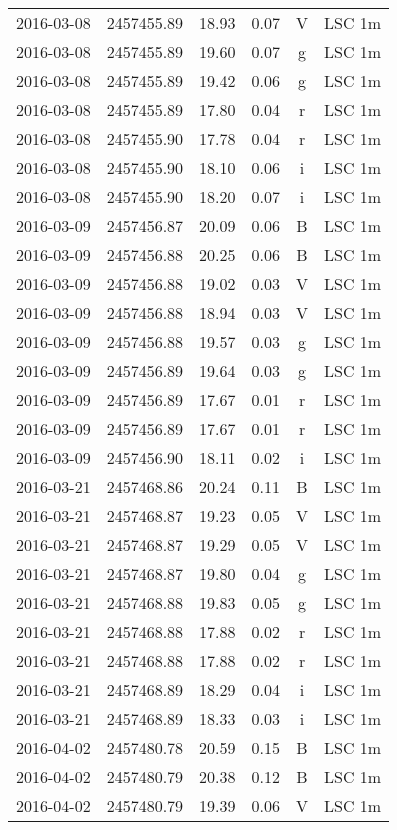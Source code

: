 \begin{table}
\begin{tabular}{cccccc}
2016-03-08 & 2457455.89 & 18.93 & 0.07 & V & LSC 1m \\
2016-03-08 & 2457455.89 & 19.60 & 0.07 & g & LSC 1m \\
2016-03-08 & 2457455.89 & 19.42 & 0.06 & g & LSC 1m \\
2016-03-08 & 2457455.89 & 17.80 & 0.04 & r & LSC 1m \\
2016-03-08 & 2457455.90 & 17.78 & 0.04 & r & LSC 1m \\
2016-03-08 & 2457455.90 & 18.10 & 0.06 & i & LSC 1m \\
2016-03-08 & 2457455.90 & 18.20 & 0.07 & i & LSC 1m \\
2016-03-09 & 2457456.87 & 20.09 & 0.06 & B & LSC 1m \\
2016-03-09 & 2457456.88 & 20.25 & 0.06 & B & LSC 1m \\
2016-03-09 & 2457456.88 & 19.02 & 0.03 & V & LSC 1m \\
2016-03-09 & 2457456.88 & 18.94 & 0.03 & V & LSC 1m \\
2016-03-09 & 2457456.88 & 19.57 & 0.03 & g & LSC 1m \\
2016-03-09 & 2457456.89 & 19.64 & 0.03 & g & LSC 1m \\
2016-03-09 & 2457456.89 & 17.67 & 0.01 & r & LSC 1m \\
2016-03-09 & 2457456.89 & 17.67 & 0.01 & r & LSC 1m \\
2016-03-09 & 2457456.90 & 18.11 & 0.02 & i & LSC 1m \\
2016-03-21 & 2457468.86 & 20.24 & 0.11 & B & LSC 1m \\
2016-03-21 & 2457468.87 & 19.23 & 0.05 & V & LSC 1m \\
2016-03-21 & 2457468.87 & 19.29 & 0.05 & V & LSC 1m \\
2016-03-21 & 2457468.87 & 19.80 & 0.04 & g & LSC 1m \\
2016-03-21 & 2457468.88 & 19.83 & 0.05 & g & LSC 1m \\
2016-03-21 & 2457468.88 & 17.88 & 0.02 & r & LSC 1m \\
2016-03-21 & 2457468.88 & 17.88 & 0.02 & r & LSC 1m \\
2016-03-21 & 2457468.89 & 18.29 & 0.04 & i & LSC 1m \\
2016-03-21 & 2457468.89 & 18.33 & 0.03 & i & LSC 1m \\
2016-04-02 & 2457480.78 & 20.59 & 0.15 & B & LSC 1m \\
2016-04-02 & 2457480.79 & 20.38 & 0.12 & B & LSC 1m \\
2016-04-02 & 2457480.79 & 19.39 & 0.06 & V & LSC 1m \\

\end{tabular}
\end{table}
